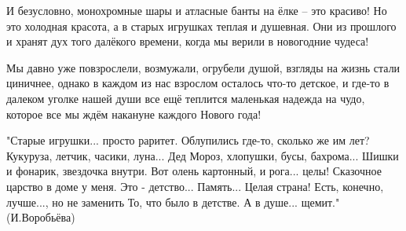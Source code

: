 И безусловно, монохромные шары и атласные банты на ёлке – это красиво! Но это
холодная красота, а в старых игрушках теплая и душевная. Они из прошлого и
хранят дух того  далёкого  времени, когда мы верили в новогодние чудеса!

Мы давно уже повзрослели, возмужали, огрубели душой, взгляды на жизнь стали
циничнее, однако в каждом из нас взрослом осталось что-то детское, и  где-то в
далеком уголке нашей души все ещё теплится маленькая надежда на чудо, которое
все мы ждём накануне каждого Нового года!

\obeycr
"Старые игрушки... просто раритет.
Облупились где-то, сколько же им лет?
Кукуруза, летчик, часики, луна...
Дед Мороз, хлопушки, бусы, бахрома...
Шишки и фонарик, звездочка внутри.
Вот олень картонный, и рога... целы!
Сказочное царство в доме у меня.
Это - детство... Память... Целая страна!
Есть, конечно, лучше..., но не заменить
То, что было в детстве. А в душе... щемит."
\smallskip
(И.Воробьёва)
\restorecr
